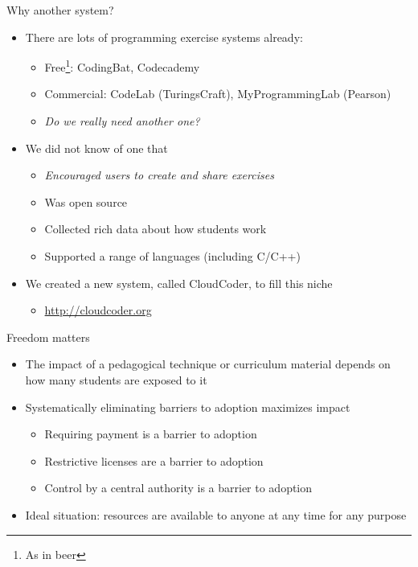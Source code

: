 \documentclass{beamer}
\begin{document}
\begin{frame}{Why another system?}

\begin{itemize}
  \item There are lots of programming exercise systems already:
  \begin{itemize}
    \item Free\footnote{As in beer}: CodingBat, Codecademy
    \item Commercial: CodeLab (TuringsCraft), MyProgrammingLab (Pearson)
    \item {\em Do we really need another one?}
  \end{itemize}
  \item We did not know of one that
  \begin{itemize}
    \item {\em Encouraged users to create and share exercises}
    \item Was open source
    \item Collected rich data about how students work
    \item Supported a range of languages (including C/C++)
  \end{itemize}
  \item We created a new system, called CloudCoder, to fill this niche
    \begin{itemize}
    \item \url{http://cloudcoder.org}
    \end{itemize}
\end{itemize}

\end{frame}

\begin{frame}{Freedom matters}

\begin{itemize}
  \item The impact of a pedagogical technique or curriculum material
        depends on how many students are exposed to it
  \item Systematically eliminating barriers to adoption maximizes impact
  \begin{itemize}
    \item Requiring payment is a barrier to adoption
    \item Restrictive licenses are a barrier to adoption
    \item Control by a central authority is a barrier to adoption
  \end{itemize}
  \item Ideal situation: resources are available to anyone at any time for any purpose
\end{itemize}

\end{frame}
\end{document}
